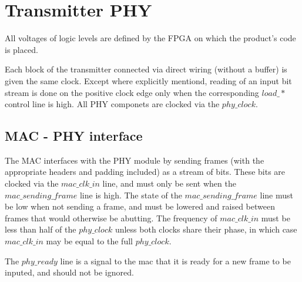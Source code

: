 \documentclass[10pt]{article}
\begin{document}

\section{Transmitter PHY}
All voltages of logic levels are defined by the FPGA on which the product's
code is placed.

Each block of the transmitter connected via direct wiring (without a buffer)
is given the same clock. Except where explicitly mentiond, reading of an input
bit stream is done on the positive clock edge only when the corresponding
$load\_*$ control line is high. All PHY componets are clocked via the
$phy\_clock$.

	\subsection{MAC - PHY interface}
	The MAC interfaces with the PHY module by sending frames (with the
	appropriate headers and padding included) as a stream of bits. These
	bits are clocked via the $mac\_clk\_in$ line, and must only be sent
	when the $mac\_sending\_frame$ line is high. The state of the
	$mac\_sending\_frame$ line must be low when not sending a frame, and
	must be lowered and raised between frames that would otherwise be
	abutting. The frequency of $mac\_clk\_in$ must be less than
	half of the $phy\_clock$ unless both clocks share their phase, in
	which case $mac\_clk\_in$ may be equal to the full $phy\_clock$.

	The $phy\_ready$ line is a signal to the mac that it is ready for a
	new frame to be inputed, and should not be ignored.
\end{document}
